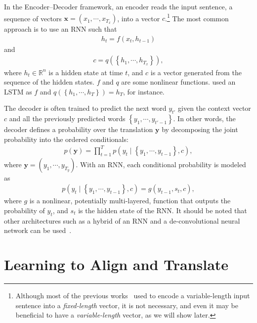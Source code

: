 \documentclass{article} %
\newcommand{\vect}[1]{\mathbf{#1}}
\newcommand{\vx}[0]{\vect{x}}
\newcommand{\vy}[0]{\vect{y}}
\newcommand{\RR}[0]{\mathbb{R}}
\begin{document}
In the Encoder--Decoder framework, an encoder reads the input sentence, a
sequence of vectors $\vx=\left( x_1, \cdots, x_{T_x} \right)$, into a vector
$c$.\footnote{
    Although most of the previous works~\citep[see,
    e.g.,][]{Cho2014,Sutskever2014,Kalchbrenner2013} used to encode a
    variable-length input sentence into a {\it fixed-length} vector, it is not
    necessary, and even it may be beneficial to have a {\it variable-length}
    vector, as we will show later.
} The most common approach is to use an RNN such that  
\begin{align}
    \label{eq:forward_state}
    h_t = f\left( x_{t}, h_{t-1} \right)
\end{align}
and
\begin{align*}
    c = q\left(\left\{ h_1, \cdots, h_{T_x} \right\}\right),
\end{align*}
where $h_t \in \RR^{n}$ is a hidden state at time $t$, and $c$ is a vector
generated from the sequence of the hidden states. $f$ and $q$ are some
nonlinear functions. \citet{Sutskever2014} used an LSTM as $f$ and
$q\left(\left\{ h_1, \cdots, h_T \right\}\right)=h_T$, for instance.

The decoder is often trained to predict the next word $y_{t'}$ given the context
vector $c$ and all the previously predicted words $\left\{ y_1, \cdots, y_{t'-1}
\right\}$. In other words, the decoder defines a probability over the
translation $\vy$ by decomposing the joint probability into the ordered
conditionals:
\begin{align}
    \label{eq:decoder_prob}
    p(\vy) = \prod_{t=1}^T p(y_t \mid \left\{ y_1, \cdots, y_{t-1} \right\}, c),
\end{align}
where $\vy = \left( y_1, \cdots, y_{T_y} \right)$. With an RNN, each
conditional probability is modeled as
\begin{align}
    \label{eq:output_rnn}
    p(y_t \mid \left\{ y_1, \cdots, y_{t-1} \right\}, c) = g(y_{t-1}, s_{t}, c),
\end{align}
where $g$ is a nonlinear, potentially multi-layered, function that outputs the
probability of $y_t$, and $s_t$ is the hidden state of the RNN.  It should be
noted that other architectures such as a hybrid of an RNN and a
de-convolutional neural network can be used~\citep{Kalchbrenner2013}.

\section{Learning to Align and Translate}
\label{sec:main}
\end{document}

